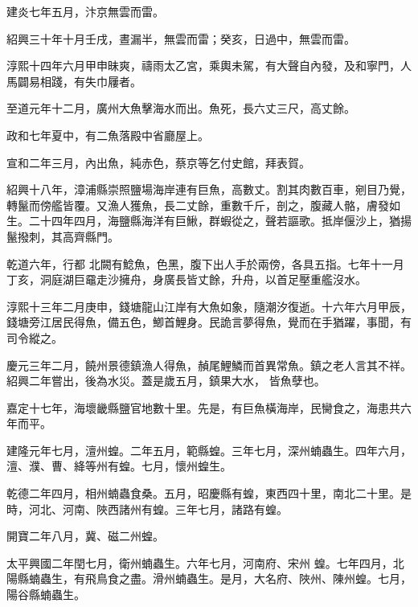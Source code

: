\begin{pinyinscope}
 建炎七年五月，汴京無雲而雷。



 紹興三十年十月壬戌，晝漏半，無雲而雷；癸亥，日過中，無雲而雷。



 淳熙十四年六月甲申昧爽，禱雨太乙宮，乘輿未駕，有大聲自內發，及和寧門，人馬闢易相踐，有失巾屨者。



 至道元年十二月，廣州大魚擊海水而出。魚死，長六丈三尺，高丈餘。



 政和七年夏中，有二魚落殿中省廳屋上。



 宣和二年三月，內出魚，純赤色，蔡京等乞付史館，拜表賀。



 紹興十八年，漳浦縣崇照鹽場海岸連有巨魚，高數丈。割其肉數百車，剜目乃覺，轉鬣而傍艦皆覆。又漁人獲魚，長二丈餘，重數千斤，剖之，腹藏人骼，膚發如生。二十四年四月，海鹽縣海洋有巨鰍，群蝦從之，聲若謳歌。抵岸偃沙上，猶揚鬣撥刺，其高齊縣門。



 乾道六年，行都
 北闕有鯰魚，色黑，腹下出人手於兩傍，各具五指。七年十一月丁亥，洞庭湖巨黿走沙擁舟，身廣長皆丈餘，升舟，以首足壓重艦沒水。



 淳熙十三年二月庚申，錢塘龍山江岸有大魚如象，隨潮汐復逝。十六年六月甲辰，錢塘旁江居民得魚，備五色，鯽首鯉身。民詭言夢得魚，覺而在手猶躍，事聞，有司令縱之。



 慶元三年二月，饒州景德鎮漁人得魚，赬尾鯉鱗而首異常魚。鎮之老人言其不祥。紹興二年嘗出，後為水災。蓋是歲五月，鎮果大水，
 皆魚孽也。



 嘉定十七年，海壞畿縣鹽官地數十里。先是，有巨魚橫海岸，民臠食之，海患共六年而平。



 建隆元年七月，澶州蝗。二年五月，範縣蝗。三年七月，深州蝻蟲生。四年六月，澶、濮、曹、絳等州有蝗。七月，懷州蝗生。



 乾德二年四月，相州蝻蟲食桑。五月，昭慶縣有蝗，東西四十里，南北二十里。是時，河北、河南、陜西諸州有蝗。三年七月，諸路有蝗。



 開寶二年八月，冀、磁二州蝗。



 太平興國二年閏七月，衛州蝻蟲生。六年七月，河南府、宋州
 蝗。七年四月，北陽縣蝻蟲生，有飛鳥食之盡。滑州蝻蟲生。是月，大名府、陜州、陳州蝗。七月，陽谷縣蝻蟲生。




\end{pinyinscope}
